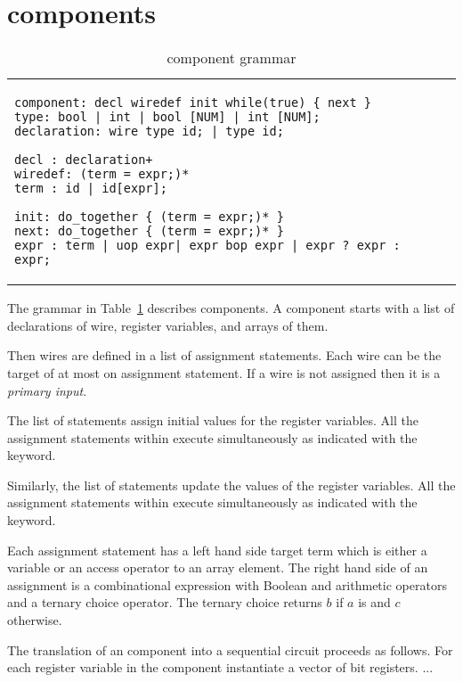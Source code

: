 \section{\this components}

\label{s:this}

\begin{table}
  \caption{\this component grammar}

\begin{tabular}{p{6cm}p{6cm}}
\begin{Verbatim}
component: decl wiredef init while(true) { next } 
type: bool | int | bool [NUM] | int [NUM]; 
declaration: wire type id; | type id;

decl : declaration+
wiredef: (term = expr;)*
term : id | id[expr]; 

init: do_together { (term = expr;)* }
next: do_together { (term = expr;)* }
expr : term | uop expr| expr bop expr | expr ? expr : expr;
\end{Verbatim}
&
\end{tabular}

\label{t:gr}
\end{table}

The grammar in Table~\ref{t:gr} describes \this components. 
A \this component starts with a list of declarations of 
wire,  register variables, and arrays of them. 

Then wires are defined in a list of assignment statements. 
Each wire can be the target of at most on assignment statement. 
If a wire is not assigned then it is a {\em primary input}. 

The  list of statements assign initial values for 
the register variables. 
All the assignment statements within  execute
simultaneously as indicated with the  keyword.

Similarly, the  list of statements update the values 
of the register variables. 
All the assignment statements within  execute 
simultaneously as indicated with the  keyword.

Each assignment statement has a left hand side target term 
which is either a variable or an access operator to an 
array element. 
The right hand side of an assignment is a combinational expression
with Boolean and arithmetic operators and a ternary choice 
operator. The ternary choice  returns $b$ if $a$ 
is \true and $c$ otherwise. 

The translation of an \this component into a sequential circuit 
proceeds as follows. 
For each register variable in the component instantiate a 
vector of bit registers. 
...
